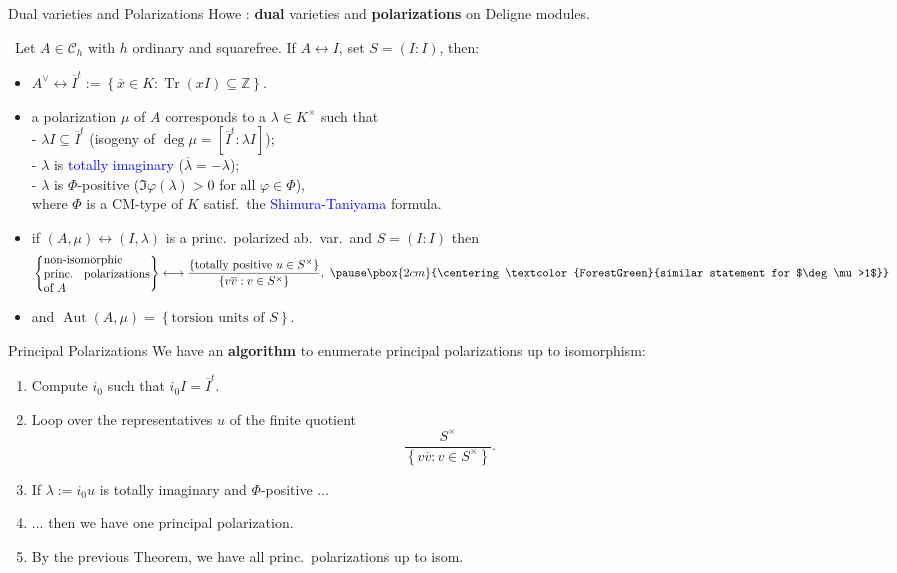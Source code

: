 \documentclass[usenames,dvipsnames]{beamer}
\def\Z{\mathbb{Z}}
\DeclareMathOperator{\Aut}{Aut}
\DeclareMathOperator{\Tr}{Tr}
\newcommand{\cC}{{\mathcal C}}
\newcommand{\vphi}{\varphi}
\newcommand{\set}[1]{\left\lbrace#1\right\rbrace }
\newcommand{\blue}[1]{\textcolor{blue}{#1}}
\newcommand{\green}[1]{\textcolor{ForestGreen}{#1}}
\begin{document}
\begin{frame}{Dual varieties and Polarizations }
	Howe : \textbf{dual} varieties and \textbf{polarizations} on Deligne modules.
\pause
	\begin{theorem}[M.]\
	Let $A\in \cC_h$ with $h$ ordinary and squarefree. If $A\leftrightarrow I$, set $S=(I:I)$, then:
	\begin{itemize}
\pause
	\item $A^\vee \leftrightarrow \overline{I}^t:=\set{ \overline{x} \in K : \Tr(xI)\subseteq \Z}$.
\pause
	\item a polarization $\mu$ of $A$ corresponds to a $\lambda\in K^\times$ such that\\
	- $\lambda I \subseteq \overline{I}^t$ (isogeny of $\deg \mu= [\overline{I}^t : \lambda I]$);\\
	- $\lambda$ is \blue{totally imaginary} ($\overline \lambda = -\lambda$);\\
	- $\lambda$ is $\Phi$-positive ($\Im\vphi(\lambda)>0$ for all $\vphi\in \Phi$),\\
		where $\Phi$ is a CM-type of $K$ satisf.~the \blue{Shimura-Taniyama} formula.\\ 
\pause
	\item if $(A,\mu) \leftrightarrow (I,\lambda)$ is a princ.~polarized ab.~var.~and $S=(I:I)$ then
	\vspace{-0.8em}
	\[\set{\parbox[p]{9em}{non-isomorphic princ. polarizations of $A$}} \longleftrightarrow \dfrac{\set{\text{totally positive }u\in S^\times }}{\set{v\overline{v}: v\in S^\times}},\
\pause
	\pbox{2cm}{\centering \green{similar statement for $\deg\mu>1$}}   
	\]
	\vspace{-1.7em}
\pause
	\item  and $\Aut(A,\mu) = \set{\text{torsion units of $S$}}$.
	\end{itemize}
	\end{theorem}
\end{frame}


\begin{frame}{Principal Polarizations}
	We have an {\bf algorithm} to enumerate principal polarizations up to isomorphism:
\pause
	\begin{enumerate}
	\item Compute $i_0$ such that $i_0 I = \overline{I}^t$.
\pause
	\item Loop over the representatives $u$ of the finite quotient
	\[ \frac{S^\times}{\set{v\overline{v}: v\in S^\times}}. \]
\pause    
	\item If $\lambda:=i_0 u$ is totally imaginary and $\Phi$-positive ...
\pause    
	\item ... then we have one principal polarization.
\pause    
	\item By the previous Theorem, we have all princ.~polarizations up to isom.
	\end{enumerate}
\end{frame}
\end{document}
